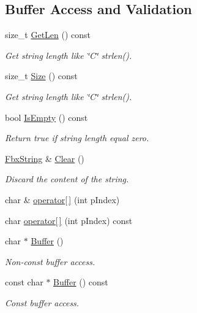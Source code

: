 \subsection*{Buffer Access and Validation}
\begin{DoxyCompactItemize}
\item 
size\+\_\+t \hyperlink{class_fbx_string_aeeead7b16201dd92aa3353c131f40c28}{Get\+Len} () const
\begin{DoxyCompactList}\small\item\em Get string length like \char`\"{}\+C\char`\"{} strlen(). \end{DoxyCompactList}\item 
size\+\_\+t \hyperlink{class_fbx_string_afe2befa6b6caf1a4b0ceda5cebb9cb39}{Size} () const
\begin{DoxyCompactList}\small\item\em Get string length like \char`\"{}\+C\char`\"{} strlen(). \end{DoxyCompactList}\item 
bool \hyperlink{class_fbx_string_af765fdc2a9878ae3474839ac6f6db525}{Is\+Empty} () const
\begin{DoxyCompactList}\small\item\em Return {\ttfamily true} if string length equal zero. \end{DoxyCompactList}\item 
\hyperlink{class_fbx_string}{Fbx\+String} \& \hyperlink{class_fbx_string_a8adc4e498591b2ed324da12db298cede}{Clear} ()
\begin{DoxyCompactList}\small\item\em Discard the content of the string. \end{DoxyCompactList}\item 
char \& \hyperlink{class_fbx_string_a64128ed6e3448248104ccb7c3a2bec1c}{operator\mbox{[}$\,$\mbox{]}} (int p\+Index)
\item 
char \hyperlink{class_fbx_string_a8c9dc4db6de88fef3281566da81d74e7}{operator\mbox{[}$\,$\mbox{]}} (int p\+Index) const
\item 
char $\ast$ \hyperlink{class_fbx_string_ac41dc796638cda32faebf887a88e769b}{Buffer} ()
\begin{DoxyCompactList}\small\item\em Non-\/const buffer access. \end{DoxyCompactList}\item 
const char $\ast$ \hyperlink{class_fbx_string_af23b5752c4eb99775b7cdca217e884fc}{Buffer} () const
\begin{DoxyCompactList}\small\item\em Const buffer access. \end{DoxyCompactList}\end{DoxyCompactItemize}
